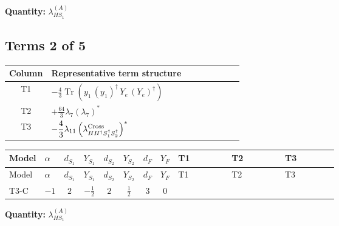 \documentclass[8pt]{article}
\begin{document}
\begin{landscape}
\begin{longtable}{@{}llcccccc >{\raggedright\arraybackslash}p{0.21\linewidth} >{\raggedright\arraybackslash}p{0.21\linewidth} >{\raggedright\arraybackslash}p{0.21\linewidth}@{}}
\midrule
\bottomrule
\end{longtable}
\clearpage
\noindent\textbf{Quantity: }$\lambda_{HS_1}^{(A)}$\par\smallskip
\subsection*{Terms 2 of 5}
\begin{center}
\begin{tabular}{@{}c >{\raggedright\arraybackslash}p{0.82\linewidth}@{}}
\toprule
Column & Representative term structure \\
\midrule
T1 & \(\displaystyle -\frac{4}{3} \operatorname{Tr}\!\left({y_1}\,\left({y_1}\right)^{\dagger}\,{Y_e}\,\left({Y_e}\right)^{\dagger}\right)\) \\
\midrule
T2 & \(\displaystyle +\frac{64}{3} {\lambda_{7}} \left({\lambda_{7}}\right)^{*}\) \\
\midrule
T3 & \(\displaystyle -\frac{4}{3} {\lambda_{11}} \left({\lambda_{H H^\dagger S_1^\dagger S_2^\dagger}^{\rm Cross}}\right)^{*}\) \\
\midrule
\bottomrule
\end{tabular}
\end{center}
\smallskip
\tiny
\begin{longtable}{@{}llcccccc >{\raggedright\arraybackslash}p{0.21\linewidth} >{\raggedright\arraybackslash}p{0.21\linewidth} >{\raggedright\arraybackslash}p{0.21\linewidth}@{}}
\toprule
Model & $\alpha$ & $d_{S_1}$ & $Y_{S_1}$ & $d_{S_2}$ & $Y_{S_2}$ & $d_F$ & $Y_F$ & T1 & T2 & T3 \\
\midrule
\endfirsthead
\toprule
Model & $\alpha$ & $d_{S_1}$ & $Y_{S_1}$ & $d_{S_2}$ & $Y_{S_2}$ & $d_F$ & $Y_F$ & T1 & T2 & T3 \\
\midrule
\endhead
T3-C & $-1$ & $2$ & $-\frac{1}{2}$ & $2$ & $\frac{1}{2}$ & $3$ & $0$ & \scriptsize\adjustbox{max width=\linewidth}{$\begin{gathered} -\frac{4}{3} \operatorname{Tr}\!\left({y_1}\,\left({y_1}\right)^{\dagger}\,{Y_e}\,\left({Y_e}\right)^{\dagger}\right)\end{gathered}$} & \scriptsize\adjustbox{max width=\linewidth}{$\begin{gathered} +\frac{64}{3} {\lambda_{7}} \left({\lambda_{7}}\right)^{*}\end{gathered}$} & \scriptsize\adjustbox{max width=\linewidth}{$\begin{gathered} -\frac{4}{3} {\lambda_{11}} \left({\lambda_{H H^\dagger S_1^\dagger S_2^\dagger}^{\rm Cross}}\right)^{*}\end{gathered}$} \\
\midrule
\bottomrule
\end{longtable}
\clearpage
\noindent\textbf{Quantity: }$\lambda_{HS_1}^{(A)}$\par\smallskip

\end{landscape}
\end{document}
